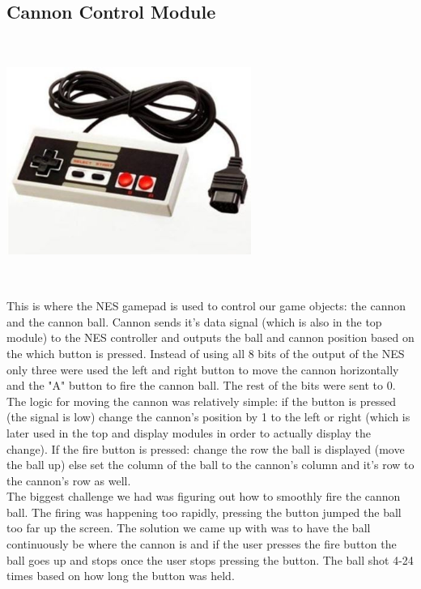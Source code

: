 \documentclass[12pt]{article}
\begin{document}
\begin{flushleft}
\subsection{Cannon Control Module}
\begin{center}
\includegraphics[width=8cm, height=8cm]{nes}
\end{center}
This is where the NES gamepad is used to control our game objects: the cannon
and the cannon ball. Cannon sends it's data signal (which is also in the top
module) to the NES controller and outputs the ball and cannon position based on
the which button is pressed. Instead of using all 8 bits of the output of the
NES only three were used the left and right button to move the cannon
horizontally and the "A" button to fire the cannon ball. The rest of the bits
were sent to 0. \\
\hfill \break
The logic for moving the cannon was relatively simple: if the button is pressed
(the signal is low) change the cannon's position by 1 to the left or right (which is later used in the top
and display modules in order to actually display the change). If the fire button
is pressed: change the row the ball is displayed (move the ball up) else set the
column of the ball to the cannon's column and it's row to the cannon's row as
well. \\

\hfill \break
The biggest challenge we had was figuring out how to smoothly fire the cannon
ball. The firing was happening too rapidly, pressing the button jumped the ball
too far up the screen. The solution we came up with was to have the ball
continuously be where the cannon is and if the user presses the fire button the
ball goes up and stops once the user stops pressing the button. The ball shot
4-24 times based on how long the button was held. 

\end{flushleft}
\end{document}
